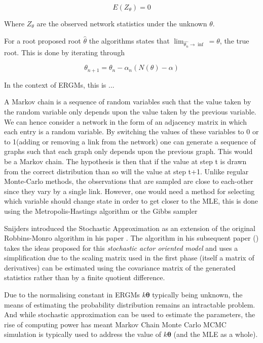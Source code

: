 \begin{equation}
E(Z_\theta) = 0
\end{equation}

Where $Z_\theta$ are the observed network statistics under the unknown $\theta$.

For a root proposed root $\hat{\theta}$ the \citeauthor{robbinsmonro1951} algorithms states that $\lim_{\hat{\theta_n} \rightarrow \inf} = \theta$, the true root. This is done by iterating through 

\begin{equation}
\label{eqn:rm_update}
\theta_{n+1} = \theta_{n} - \alpha_n(N(\theta) - \alpha)
\end{equation}



In the context of ERGMs, this is ...

A Markov chain is a sequence of random variables such that the value taken by the random variable only depends upon the value taken by the previous variable. We can hence consider a network in the form of an adjacency matrix in which each entry is a random variable. By switching the values of these variables to 0 or to 1(adding or removing a link from the network) one can generate a sequence of graphs such that each graph only depends upon the previous graph. This would be a Markov chain. The hypothesis is then that if the value at step t is drawn from the correct distribution than so will the value at step t+1. Unlike regular Monte-Carlo methods, the observations that are sampled are close to each-other since they vary by a single link. However, one would need a method for selecting which variable should change state in order to get closer to the MLE, this is done using the Metropolis-Hastings algorithm or the Gibbs sampler





Snijders introduced the Stochastic Approximation as an extension of the original Robbins-Monro algorithm in his paper \cite{snijders2001}. The algorithm in his subsequent paper (\cite{snijders2002}) takes the ideas proposed for this \textit{stochastic actor oriented model} and uses a simplification due to the scaling matrix used in the first phase (itself a matrix of derivatives) can be estimated using the covariance matrix of the generated statistics rather than by a finite quotient difference.

Due to the normalising constant in ERGMs $k\boldsymbol{\theta}$ typically being unknown, the means of estimating the probability distribution remains an intractable problem. And while stochastic approximation can be used to estimate the parameters, the rise of computing power has meant Markov Chain Monte Carlo MCMC simulation is typically used to address the value of $k\boldsymbol{\theta}$ (and the MLE as a whole).

